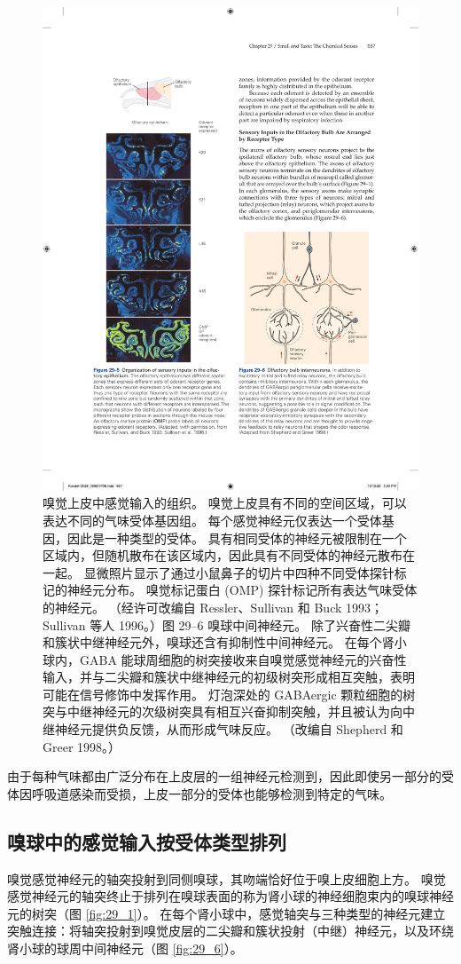 \begin{figure}[htbp]
	\centering
	\includegraphics[width=0.4\linewidth]{chap29/fig_29_5}
	\caption{嗅觉上皮中感觉输入的组织。 嗅觉上皮具有不同的空间区域，可以表达不同的气味受体基因组。 每个感觉神经元仅表达一个受体基因，因此是一种类型的受体。 具有相同受体的神经元被限制在一个区域内，但随机散布在该区域内，因此具有不同受体的神经元散布在一起。 显微照片显示了通过小鼠鼻子的切片中四种不同受体探针标记的神经元分布。 嗅觉标记蛋白 (OMP) 探针标记所有表达气味受体的神经元。 （经许可改编自 Ressler、Sullivan 和 Buck 1993；Sullivan 等人 1996。）图 29–6 嗅球中间神经元。 除了兴奋性二尖瓣和簇状中继神经元外，嗅球还含有抑制性中间神经元。 在每个肾小球内，GABA 能球周细胞的树突接收来自嗅觉感觉神经元的兴奋性输入，并与二尖瓣和簇状中继神经元的初级树突形成相互突触，表明可能在信号修饰中发挥作用。 灯泡深处的 GABAergic 颗粒细胞的树突与中继神经元的次级树突具有相互兴奋抑制突触，并且被认为向中继神经元提供负反馈，从而形成气味反应。 （改编自 Shepherd 和 Greer 1998。）}
	\label{fig:29_5}
\end{figure}


由于每种气味都由广泛分布在上皮层的一组神经元检测到，因此即使另一部分的受体因呼吸道感染而受损，上皮一部分的受体也能够检测到特定的气味。

\subsection{嗅球中的感觉输入按受体类型排列}
嗅觉感觉神经元的轴突投射到同侧嗅球，其吻端恰好位于嗅上皮细胞上方。 嗅觉感觉神经元的轴突终止于排列在嗅球表面的称为肾小球的神经细胞束内的嗅球神经元的树突（图 \ref{fig:29_1}）。 在每个肾小球中，感觉轴突与三种类型的神经元建立突触连接：将轴突投射到嗅觉皮层的二尖瓣和簇状投射（中继）神经元，以及环绕肾小球的球周中间神经元（图 \ref{fig:29_6}）。

